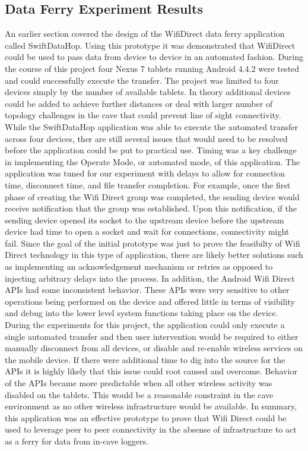 \documentclass[10pt,twocolumn]{article}
\begin{document}
\subsection{Data Ferry Experiment Results}
An earlier section covered the design of the WifiDirect data ferry application called SwiftDataHop. 
Using this prototype it was demonstrated that WifiDirect could be used to pass data from device to device in an automated fashion. 
During the course of this project four Nexus 7 tablets running Android 4.4.2 were tested and could successfully execute the transfer.
The project was limited to four devices simply by the number of available tablets.
In theory additional devices could be added to achieve further distances or deal with larger number of topology challenges in the cave that could prevent line of sight connectivity. 
While the SwiftDataHop application was able to execute the automated transfer across four devices, ther are still several issues that would need to be resolved before the application could be put to practical use.
Timing was a key challenge in implementing the Operate Mode, or automated mode, of this application.
The application was tuned for our experiment with delays to allow for connection time, disconnect time, and file transfer completion.
For example, once the first phase of creating the Wifi Direct group was completed, the sending device would receive notification that the group was established.  
Upon this notification, if the sending device opened its socket to the upstream device before the upstream device had time to open a socket and wait for connections, connectivity might fail.
Since the goal of the initial prototype was just to prove the feasibilty of Wifi Direct technology in this type of application, there are likely better solutions such as implementing an acknowledgement mechanism or retries as opposed to injecting arbitrary delays into the process. 
In addition, the Android Wifi Direct APIs had some inconsistent behavior.
These APIs were very sensitive to other operations being performed on the device and offered little in terms of visibility and debug into the lower level system functions taking place on the device.
During the experiments for this project, the application could only execute a single automated transfer and then user intervention would be required to either manually disconnect from all devices, or disable and re-enable wireless services on the mobile device.
If there were additional time to dig into the source for the APIs it is highly likely that this issue could root caused and overcome.
Behavior of the APIs became more predictable when all other wireless activity was disabled on the tablets.
This would be a reasonable constraint in the cave environment as no other wireless infrastructure would be available.
In summary, this application was an effective prototype to prove that Wifi Direct could be used to leverage peer to peer connectivity in the absense of infrastructure to act as a ferry for data from in-cave loggers.
\end{document}
